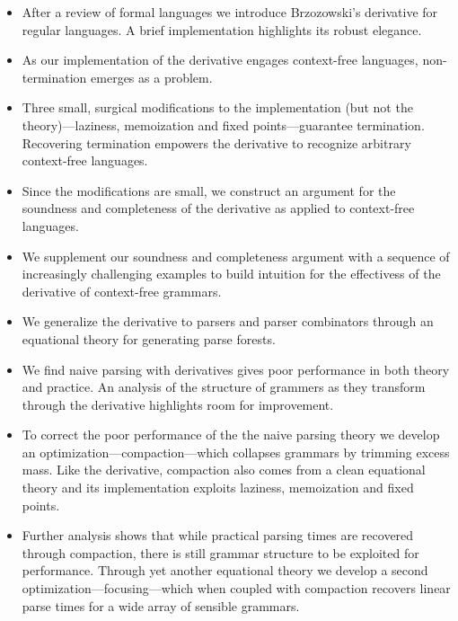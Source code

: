 \begin{itemize}

\item 
After a review of formal languages we introduce Brzozowski's derivative for
regular languages.  A brief implementation highlights its robust elegance.

\item 
As our implementation of the derivative engages context-free languages,
non-termination emerges as a problem.

\item 
Three small, surgical modifications to the implementation (but not the
theory)---laziness, memoization and fixed points---guarantee termination.
%
Recovering termination empowers the derivative to recognize arbitrary
context-free languages.

\item
Since the modifications are small, we construct an argument for the
soundness and completeness of the derivative as applied to context-free
languages.

\item
We supplement our soundness and completeness argument with a sequence of
increasingly challenging examples to build intuition
for the effectivess of the derivative of context-free grammars.

\item 
We generalize the derivative to parsers and parser combinators through an
equational theory for generating parse forests.

\item 
We find naive parsing with derivatives gives poor performance in both theory
and practice.
%
An analysis of the structure of grammers as they transform through the
derivative highlights room for improvement.

\item 
To correct the poor performance of the the naive parsing theory we develop an
optimization---compaction---which collapses grammars by trimming excess mass.
%
Like the derivative, compaction also comes from a clean equational theory and
its implementation exploits laziness, memoization and fixed points.

\item
Further analysis shows that while practical parsing times are recovered through
compaction, there is still grammar structure to be exploited for performance.
%
Through yet another equational theory we develop a second
optimization---focusing---which when coupled with compaction recovers linear
parse times for a wide array of sensible grammars.


\end{itemize}
